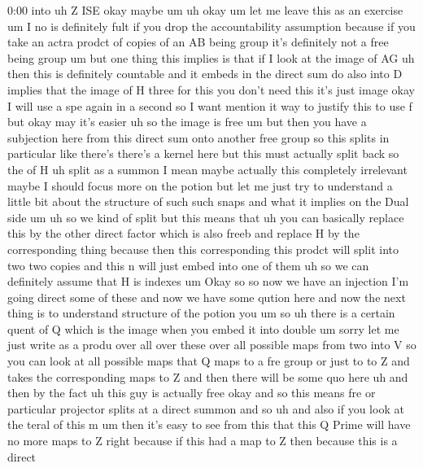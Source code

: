 \begin{unfinished}{0:00}
into
uh  Z
ISE  okay
maybe
um
uh  okay
um  let  me  leave  this  as  an  exercise
um  I  no  is  definitely  fult  if  you  drop
the  accountability  assumption  because  if
you  take  an  actra  prodct  of  copies  of  an
AB  being  group  it's  definitely  not  a
free  being
group  um  but  one  thing  this  implies  is
that  if  I  look  at  the  image  of
AG  uh  then  this  is  definitely  countable
and  it  embeds  in  the  direct  sum  do  also
into
D  implies  that  the  image  of
H
three  for  this  you  don't  need  this  it's
just
image  okay  I  will  use  a  spe  again  in  a
second  so  I  want  mention  it  way  to
justify  this  to  use  f  but  okay  may  it's
easier  uh  so  the  image  is  free  um  but
then  you  have  a  subjection  here  from
this  direct  sum  onto  another  free  group
so  this  splits  in  particular  like
there's  there's  a  kernel
here  but  this  must  actually  split  back
so  the  of
H  uh  split  as  a
summon  I  mean  maybe  actually  this
completely  irrelevant  maybe  I  should
focus  more  on  the  potion  but  let  me  just
try  to  understand  a  little  bit  about  the
structure  of  such  such  snaps  and  what  it
implies  on  the  Dual  side
um  uh  so  we  kind  of  split  but  this  means
that  uh  you  can  basically  replace  this
by  the  other  direct  factor  which  is  also
freeb
and  replace  H  by  the  corresponding  thing
because  then  this  corresponding  this
prodct  will  split  into  two  two  copies
and  this  n  will  just  embed  into  one  of
them  uh
so  we  can  definitely  assume  that  H  is
indexes  um  Okay  so  so  now  we  have  an
injection  I'm  going  direct  some  of
these  and  now  we  have  some  qution
here  and  now  the  next  thing  is  to
understand  structure  of  the
potion
you
um  so
uh  there  is  a  certain  quent  of  Q  which
is  the  image  when  you  embed  it  into
double  um
sorry  let  me  just  write  as  a  produ  over
all  over  these  over  all  possible  maps
from  two  into
V  so  you  can  look  at  all  possible  maps
that  Q  maps  to  a  fre  group  or  just  to  to
Z  and  takes  the  corresponding  maps  to  Z
and  then  there  will  be  some  quo  here  uh
and  then  by  the
fact  uh  this  guy  is  actually
free  okay  and  so  this  means  fre
or  particular  projector  splits  at  a
direct
summon  and
so  uh  and  also  if  you  look  at  the  teral
of  this  m  um  then  it's  easy  to  see  from
this  that  this  Q  Prime  will  have  no  more
maps  to  Z  right  because  if  this  had  a
map  to  Z  then  because  this  is  a  direct

\end{unfinished}
